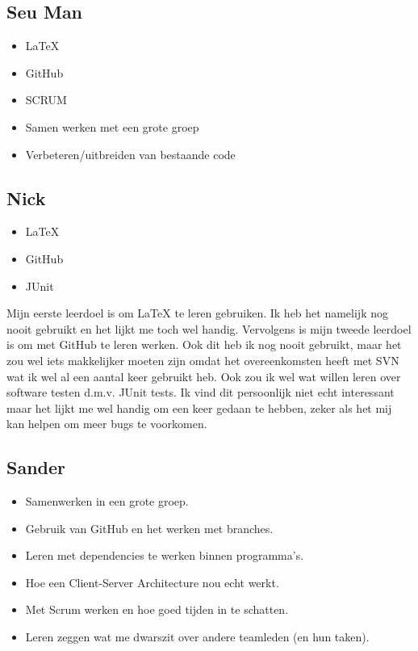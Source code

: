 \documentclass{article}
\begin{document}
\subsection*{Seu Man}
\begin{itemize}
	\item \LaTeX
	\item GitHub
	\item SCRUM
	\item Samen werken met een grote groep
	\item Verbeteren/uitbreiden van bestaande code
\end{itemize}

\subsection*{Nick}
\begin{itemize}
	\item \LaTeX
	\item GitHub
	\item JUnit
\end{itemize} 
Mijn eerste leerdoel is om \LaTeX{} te leren gebruiken. Ik heb het namelijk nog nooit gebruikt en het lijkt me toch wel handig. Vervolgens is mijn tweede leerdoel is om met GitHub te leren werken. Ook dit heb ik nog nooit gebruikt,  maar het zou wel iets makkelijker moeten zijn omdat het overeenkomsten heeft met SVN wat ik wel al
een aantal keer gebruikt heb. Ook zou ik wel wat willen leren over software testen d.m.v. JUnit tests. Ik vind dit persoonlijk niet echt interessant maar het lijkt me wel handig om een keer gedaan te hebben, zeker als het mij kan helpen om  meer bugs te voorkomen.

\subsection*{Sander}
\begin{itemize}
	\item Samenwerken in een grote groep.
	\item Gebruik van GitHub en het werken met branches.
	\item Leren met dependencies te werken binnen programma's.
	\item Hoe een Client-Server Architecture nou echt werkt.
	\item Met Scrum werken en hoe goed tijden in te schatten.
	\item Leren zeggen wat me dwarszit over andere teamleden (en hun taken).
\end{itemize}
\end{document}
